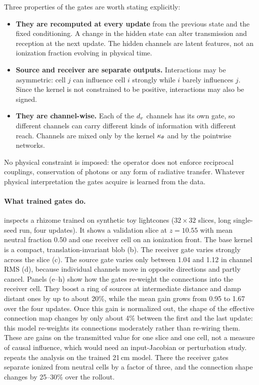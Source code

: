 Three properties of the gates are worth stating explicitly:
\begin{itemize}
  \item \textbf{They are recomputed at every update} from the previous state and the fixed conditioning. A change in the hidden state can alter transmission and reception at the next update. The hidden channels are latent features, not an ionization fraction evolving in physical time.
  \item \textbf{Source and receiver are separate outputs.} Interactions may be asymmetric: cell $j$ can influence cell $i$ strongly while $i$ barely influences $j$. Since the kernel is not constrained to be positive, interactions may also be signed.
  \item \textbf{They are channel-wise.} Each of the $d_v$ channels has its own gate, so different channels can carry different kinds of information with different reach. Channels are mixed only by the kernel $\kappa_\theta$ and by the pointwise networks.
\end{itemize}
No physical constraint is imposed: the operator does not enforce reciprocal couplings, conservation of photons or any form of radiative transfer. Whatever physical interpretation the gates acquire is learned from the data.

\paragraph{What trained gates do.}  inspects a rhizome trained on synthetic toy lightcones ($32\times32$ slices, long single-seed run, four updates). It shows a validation slice at $z=10.55$ with mean neutral fraction 0.50 and one receiver cell on an ionization front. The base kernel is a compact, translation-invariant blob (b). The receiver gate varies strongly across the slice (c). The source gate varies only between 1.04 and 1.12 in channel RMS (d), because individual channels move in opposite directions and partly cancel. Panels (e--h) show how the gates re-weight the connections into the receiver cell. They boost a ring of sources at intermediate distance and damp distant ones by up to about 20\%, while the mean gain grows from 0.95 to 1.67 over the four updates. Once this gain is normalized out, the shape of the effective connection map changes by only about 4\% between the first and the last update: this model re-weights its connections moderately rather than re-wiring them. These are gains on the transmitted value for one slice and one cell, not a measure of causal influence, which would need an input-Jacobian or perturbation study.  repeats the analysis on the trained 21\,cm model. There the receiver gates separate ionized from neutral cells by a factor of three, and the connection shape changes by 25--30\% over the rollout.

